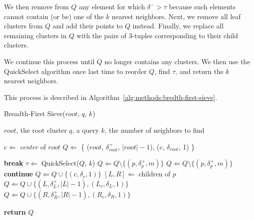 We then remove from $Q$ any element for which $\delta^{-} > \tau$ because such elements cannot contain (or be) one of the $k$ nearest neighbors.
Next, we remove all leaf clusters from $Q$ and add their points to $Q$ instead.
Finally, we replace all remaining clusters in $Q$ with the pairs of 3-tuples corresponding to their child clusters.

We continue this process until $Q$ no longer contains any clusters.
We then use the QuickSelect algorithm once last time to reorder $Q$, find $\tau$, and return the $k$ nearest neighbors.

This process is described in Algorithm~\ref{alg:methods:bredth-first-sieve}. 

\begin{algorithm} %
    \caption{Breadth-First Sieve($root$, $q$, $k$)} %
    \label{alg:methods:bredth-first-sieve} %
    \begin{algorithmic} %
        \REQUIRE $root$, the root cluster
        \REQUIRE $q$, a query
        \REQUIRE $k$, the number of neighbors to find

        \STATE $c \Leftarrow$ \textit{center} of $root$
        \STATE $Q \Leftarrow$ \{ ($root$, $\delta^{+}_{root}$, $|root| - 1$), ($c$, $\delta_{root}$, 1) \}

        \ALOOP{}
                \STATE \textbf{break}
            \ENDIF
            \STATE $\tau \Leftarrow$ QuickSelect($Q$, $k$)
                    \STATE $Q \Leftarrow Q \setminus \{ (p, \delta^{+}_{p}, m) \}$
                \ENDIF
            \ENDFOR
                \STATE $Q \Leftarrow Q \setminus \{ (p, \delta^{+}_{p}, m) \}$
                    \STATE \textbf{continue}
                        \STATE $Q \Leftarrow Q \cup \{ (c, \delta_{c}, 1) \}$
                    \ENDFOR
                \ELSE
                    \STATE $[L, R] \Leftarrow$ children of $p$
                    \STATE $Q \Leftarrow Q \cup \{ (L, \delta^{+}_{L}, |L| - 1), (L_c, \delta_{L}, 1) \}$
                    \STATE $Q \Leftarrow Q \cup \{ (R, \delta^{+}_{R}, |R| - 1), (R_c, \delta_{R}, 1) \}$
                \ENDIF
            \ENDFOR
        \ENDALOOP

        \STATE \textbf{return} $Q$
    \end{algorithmic}
\end{algorithm}


